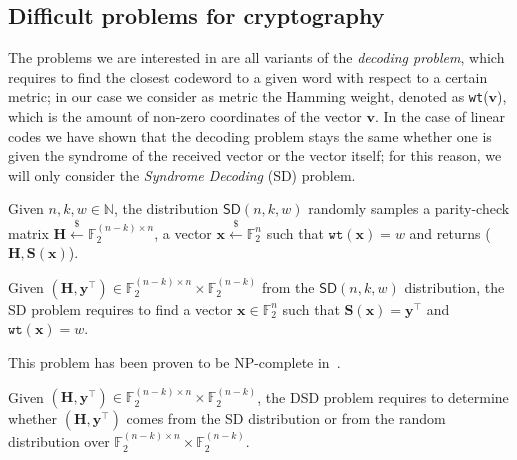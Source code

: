 \subsection{Difficult problems for cryptography}
The problems we are interested in are all variants of the \textit{decoding problem}, which requires to find 
the closest codeword to a given word with respect to a certain metric; in our case we consider as metric the Hamming
weight, denoted as \texttt{wt}($\mathbf{v}$), which is the amount of non-zero coordinates of the vector $\mathbf{v}$.
In the case of linear codes we have shown that the decoding problem stays the same whether one is given 
the syndrome of the received vector or the vector itself; for this reason, we will only consider 
the \textit{Syndrome Decoding} (\textsf{SD}) problem.\\

\begin{definition}
    Given $n,k,w \in \mathds{N}$, the distribution $\textsf{SD}(n, k, w)$ randomly samples a parity-check matrix 
    $\mathbf{H} \xleftarrow{\mathdollar} \mathds{F}_2^{(n-k)\times n}$, a vector 
    $\mathbf{x} \xleftarrow{\mathdollar} \mathds{F}_2^n$ such that $\texttt{wt}(\mathbf{x}) = w$ 
    and returns ($\mathbf{H}, \mathbf{S}(\mathbf{x})$).
\end{definition}

\begin{definition}
    Given $(\mathbf{H}, \mathbf{y}^\top) \in \mathds{F}_2^{(n-k)\times n} \times \mathds{F}_2^{(n-k)}$ from the $\textsf{SD}(n, k, w)$ 
    distribution, the \textsf{SD} problem requires to find a vector $\mathbf{x} \in \mathds{F}_2^n$ such that 
    $\mathbf{S}(\mathbf{x}) = \mathbf{y}^\top$ and $\texttt{wt}(\mathbf{x}) = w$.
\end{definition}
This problem has been proven to be NP-complete in~\cite{DBLP:journals/tit/BerlekampMT78}.

\begin{definition}
    Given $(\mathbf{H}, \mathbf{y}^\top) \in \mathds{F}_2^{(n-k)\times n} \times \mathds{F}_2^{(n-k)}$, the \textsf{DSD} problem 
    requires to determine whether $(\mathbf{H}, \mathbf{y}^\top)$ comes from the \textsf{SD} distribution or from the random
    distribution over $\mathds{F}_2^{(n-k)\times n} \times \mathds{F}_2^{(n-k)}$.
\end{definition}


 



